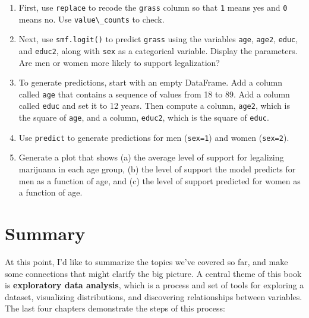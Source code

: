 \begin{enumerate}
\def\labelenumi{\arabic{enumi}.}
\item
  First, use \passthrough{\lstinline!replace!} to recode the
  \passthrough{\lstinline!grass!} column so that
  \passthrough{\lstinline!1!} means yes and \passthrough{\lstinline!0!}
  means no. Use \passthrough{\lstinline!value\_counts!} to check.
\item
  Next, use \passthrough{\lstinline!smf.logit()!} to predict
  \passthrough{\lstinline!grass!} using the variables
  \passthrough{\lstinline!age!}, \passthrough{\lstinline!age2!},
  \passthrough{\lstinline!educ!}, and \passthrough{\lstinline!educ2!},
  along with \passthrough{\lstinline!sex!} as a categorical variable.
  Display the parameters. Are men or women more likely to support
  legalization?
\item
  To generate predictions, start with an empty DataFrame. Add a column
  called \passthrough{\lstinline!age!} that contains a sequence of
  values from 18 to 89. Add a column called
  \passthrough{\lstinline!educ!} and set it to 12 years. Then compute a
  column, \passthrough{\lstinline!age2!}, which is the square of
  \passthrough{\lstinline!age!}, and a column,
  \passthrough{\lstinline!educ2!}, which is the square of
  \passthrough{\lstinline!educ!}.
\item
  Use \passthrough{\lstinline!predict!} to generate predictions for men
  (\passthrough{\lstinline!sex=1!}) and women
  (\passthrough{\lstinline!sex=2!}).
\item
  Generate a plot that shows (a) the average level of support for
  legalizing marijuana in each age group, (b) the level of support the
  model predicts for men as a function of age, and (c) the level of
  support predicted for women as a function of age.
\end{enumerate}

\hypertarget{summary}{%
\section{Summary}\label{summary}}

At this point, I'd like to summarize the topics we've covered so far,
and make some connections that might clarify the big picture. A central
theme of this book is \textbf{exploratory data analysis}, which is a
process and set of tools for exploring a dataset, visualizing
distributions, and discovering relationships between variables. The last
four chapters demonstrate the steps of this process:

